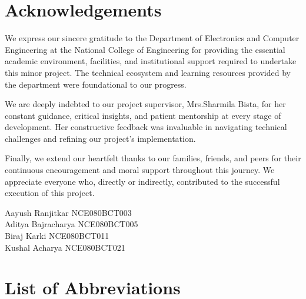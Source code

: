 \documentclass[12pt, a4paper]{report}
\numberwithin{equation}{chapter}
\begin{document}


\setcounter{page}{1}

\chapter*{Acknowledgements}

We express our sincere gratitude to the Department of Electronics and Computer Engineering at the National College of Engineering for providing the essential academic environment, facilities, and institutional support required to undertake this minor project. The technical ecosystem and learning resources provided by the department were foundational to our progress.

We are deeply indebted to our project supervisor, Mrs.Sharmila Bista, for her constant guidance, critical insights, and patient mentorship at every stage of development. Her constructive feedback was invaluable in navigating technical challenges and refining our project's implementation.

Finally, we extend our heartfelt thanks to our families, friends, and peers for their continuous encouragement and moral support throughout this journey. We appreciate everyone who, directly or indirectly, contributed to the successful execution of this project.
\vspace{2cm}
\noindent

Aayush Ranjitkar \hfill NCE080BCT003 \\
Aditya Bajracharya \hfill NCE080BCT005 \\
Biraj Karki \hfill NCE080BCT011 \\
Kushal Acharya \hfill NCE080BCT021

\newpage

\tableofcontents
\newpage

\listoffigures
{}
\newpage

\listoftables
{}
\newpage

\chapter*{List of Abbreviations}
\end{document}
